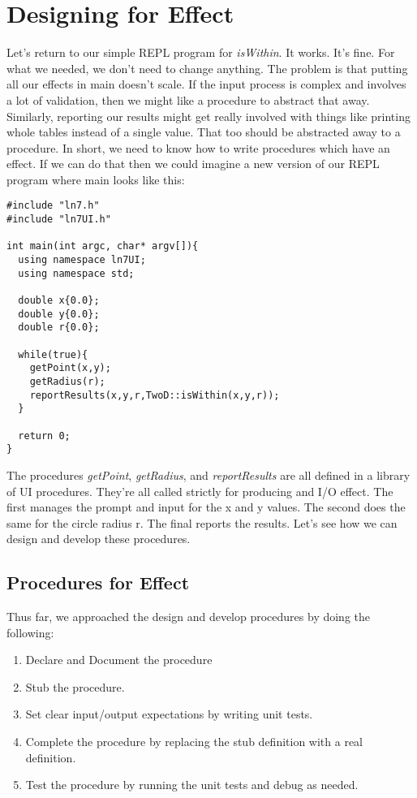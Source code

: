 
\section{Designing for Effect}

Let's return to our simple REPL program for \textit{isWithin}. It works. It's fine. For what we needed, we don't need to change anything. The problem is that putting all our effects in main doesn't scale.  If the input process is complex and involves a lot of validation, then we might like a procedure to abstract that away.  Similarly, reporting our results might get really involved with things like printing whole tables instead of a single value. That too should be abstracted away to a procedure.  In short, we need to know how to write procedures which have an effect. If we can do that then we could imagine a new version of our REPL program where main looks like this:
\begin{verbatim}
#include "ln7.h"
#include "ln7UI.h"

int main(int argc, char* argv[]){
  using namespace ln7UI;
  using namespace std;

  double x{0.0};
  double y{0.0};
  double r{0.0};

  while(true){
    getPoint(x,y);
    getRadius(r);
    reportResults(x,y,r,TwoD::isWithin(x,y,r));
  }

  return 0;
}
\end{verbatim}

The procedures \textit{getPoint}, \textit{getRadius}, and \textit{reportResults} are all defined in a library of UI procedures. They're all called strictly for producing and I/O effect. The first manages the prompt and input for the x and y values. The second does the same for the circle radius r. The final reports the results. Let's see how we can design and develop these procedures. 

\subsection{Procedures for Effect}

Thus far, we approached the design and develop procedures by doing the following:
\begin{enumerate}
\item Declare and Document the procedure
\item Stub the procedure.
\item Set clear input/output expectations by writing unit tests.
\item Complete the procedure by replacing the stub definition with a real definition.
\item Test the procedure by running the unit tests and debug as needed.
\end{enumerate}

